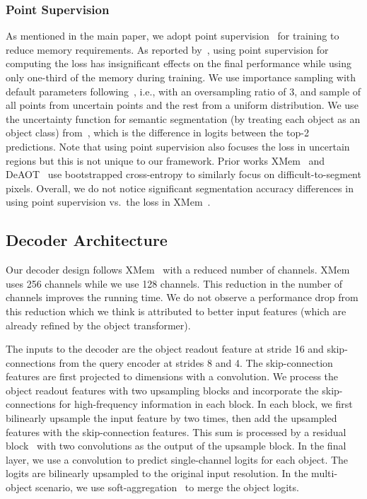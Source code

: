\subsubsection{Point Supervision}
As mentioned in the main paper, we adopt point supervision~\cite{cheng2022masked} for training to reduce memory requirements. As reported by~\cite{cheng2022masked}, using point supervision for computing the loss has insignificant effects on the final performance while using only one-third of the memory during training.
We use importance sampling with default parameters following~\cite{cheng2022masked}, i.e., with an oversampling ratio of 3, and sample  of all points from uncertain points and the rest from a uniform distribution. 
We use the uncertainty function for semantic segmentation (by treating each object as an object class) from~\cite{kirillov2020pointrend}, which is the difference in logits between the top-2 predictions.
Note that using point supervision also focuses the loss in uncertain regions but this is not unique to our framework.
Prior works XMem~\cite{cheng2022xmem} and DeAOT~\cite{yang2022decoupling} use bootstrapped cross-entropy to similarly focus on difficult-to-segment pixels. 
Overall, we do not notice significant segmentation accuracy differences in using point supervision vs.\ the loss in XMem~\cite{cheng2022xmem}.

\subsection{Decoder Architecture}
Our decoder design follows XMem~\cite{cheng2022xmem} with a reduced number of channels. XMem~\cite{cheng2022xmem} uses 256 channels while we use 128 channels.
This reduction in the number of channels improves the running time. We do not observe a performance drop from this reduction which we think is attributed to better input features (which are already refined by the object transformer).

The inputs to the decoder are the object readout feature  at stride 16 and skip-connections from the query encoder at strides 8 and 4. 
The skip-connection features are first projected to  dimensions with a  convolution. 
We process the object readout features with two upsampling blocks and incorporate the skip-connections for high-frequency information in each block.
In each block, we first bilinearly upsample the input feature by two times, then add the upsampled features with the skip-connection features. This sum is processed by a residual block~\cite{he2016deepResNet} with two  convolutions as the output of the upsample block.
In the final layer, we use a  convolution to predict single-channel logits for each object. The logits are bilinearly upsampled to the original input resolution.
In the multi-object scenario, we use soft-aggregation~\cite{oh2019videoSTM} to merge the object logits.

